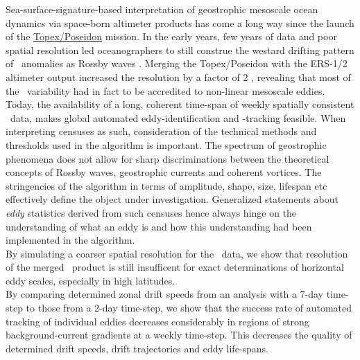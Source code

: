 Sea-surface-signature-based interpretation of geostrophic mesoscale ocean dynamics via space-born altimeter products has come a long way since the launch of the \href{http://en.wikipedia.org/wiki/TOPEX/Poseidon}{Topex/Poseidon} mission. In the early years, few years of data and poor spatial resolution led oceanographers to still construe the westard drifting pattern of \SSH~anomalies as Rossby waves \citep{le1993sea,Killworth1997a}.
Merging the Topex/Poseidon with the ERS-1/2 altimeter output increased the resolution by a factor of 2 \citep{Chelton2007}, revealing that most of the \SSH~variability had in fact to be accredited to non-linear mesoscale eddies. Today, the availability of a long, coherent time-span of weekly spatially consistent \SSH~data, makes global automated eddy-identification and -tracking feasible.
When interpreting censuses as such, consideration of the technical methods and thresholds used in the algorithm is important. The spectrum of geostrophic phenomena does not allow for sharp discriminations between the theoretical concepts of Rossby waves, geostrophic currents and coherent vortices.
The stringencies of the algorithm in terms of amplitude, shape, size, lifespan etc effectively define the object under investigation. Generalized statements about \textit{eddy} statistics derived from such censuses hence always hinge on the understanding of what an eddy is and how this understanding had been implemented in the algorithm.\\
By simulating a coarser spatial resolution for the \pop~data, we show that resolution of the merged \avi~product is still insufficent for exact determinations of horizontal eddy scales, especially in high latitudes.\\
By comparing determined zonal drift speeds from an analysis with a 7-day time-step to those from a 2-day time-step, we show that the success rate of automated tracking of individual eddies decreases considerably in regions of strong background-current gradients at a weekly time-step. This decreases the quality of determined drift speeds, drift trajectories and eddy life-spans. 
